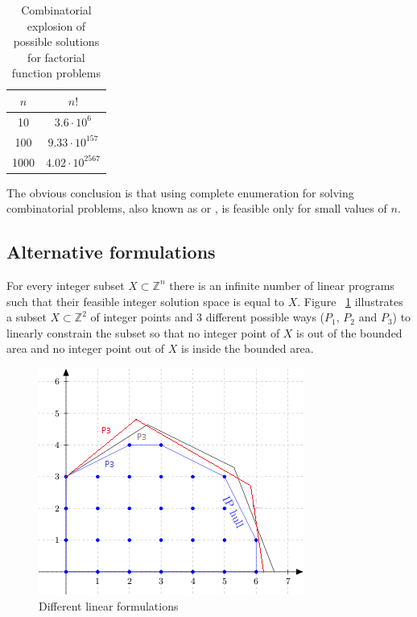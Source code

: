 \begin{table}[ht]
\caption{Combinatorial explosion of possible solutions for factorial function problems} %
\centering
\begin{tabular}{c c} 							%
\hline\hline 											%
$n$ & $n!$ \\ [0.5ex] 						%
\hline 														%
10 & $3.6 \cdot 10^6$ \\
100 & $9.33 \cdot 10^{157}$ \\
1000 & $4.02 \cdot 10^{2567}$ \\ [1ex] 	%
\hline
\end{tabular}
\label{table:factorial} 					%
\end{table}


The obvious conclusion is that using complete enumeration for solving combinatorial problems, also known as  or , is feasible only for small values of $n$.



\subsection{Alternative formulations}

For every integer subset $X \subset \mathbb{Z}^n$ there is an infinite number of linear programs such that their feasible integer solution space is equal to $X$. Figure ~\ref{fig:linearForm} illustrates a subset $X \subset \mathbb{Z}^2$ of integer points and 3 different possible ways ($P_{1}$, $P_{2}$ and $P_{3}$) to linearly constrain the subset so that no integer point of $X$ is out of the bounded area and no integer point out of $X$ is inside the bounded area.

\begin{figure}[h]
\centering
\hfill\includegraphics[scale=1.0]{figures/linearForm3.png}
\caption{Different linear formulations}
\label{fig:linearForm}
\end{figure}

